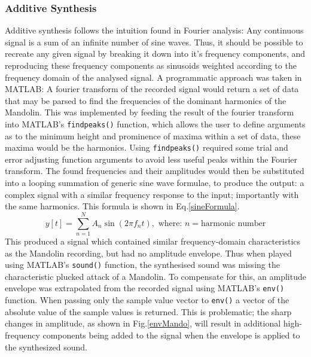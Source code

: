 \documentclass{article}
\begin{document}
        \subsubsection{Additive Synthesis}
            Additive synthesis follows the intuition found in Fourier analysis: Any continuous signal is a sum of an infinite number of sine waves.
            Thus, it should be possible to recreate any given signal by breaking it down into it's frequency components, and reproducing these frequency components as sinusoids weighted according to the frequency domain of the analysed signal.
            A programmatic approach was taken in MATLAB: A fourier transform of the recorded signal would return a set of data that may be parsed to find the frequencies of the dominant harmonics of the Mandolin.
            This was implemented by feeding the result of the fourier transform into MATLAB's \texttt{findpeaks()} function, which allows the user to define arguments as to the minimum height and prominence of maxima within a set of data, these maxima would be the harmonics.
            Using \texttt{findpeaks()} required some trial and error adjusting function arguments to avoid less useful peaks within the Fourier transform.
            The found frequencies and their amplitudes would then be substituted into a looping summation of generic sine wave formulae, to produce the output: a complex signal with a similar frequency response to the input; importantly with the same harmonics.
            This formula is shown in Eq.\ref{sineFormula}.
            \begin{equation}
                y[t] = \sum_{n=1}^{N} A_n \sin{(2 \pi f_n t)}, \text{ where: } n = \text{harmonic number}
                \label{sineFormula}
            \end{equation}
            This produced a signal which contained similar frequency-domain characteristics as the Mandolin recording, but had no amplitude envelope.
            Thus when played using MATLAB's \texttt{sound()} function, the synthesised sound was missing the characteristic plucked attack of a Mandolin.
            To compensate for this, an amplitude envelope was extrapolated from the recorded signal using MATLAB's \texttt{env()} function.
            When passing only the sample value vector to \texttt{env()} a vector of the absolute value of the sample values is returned.
            This is problematic; the sharp changes in amplitude, as shown in Fig.\ref{envMando}, will result in additional high-frequency components being added to the signal when the envelope is applied to the synthesized sound.
\end{document}
